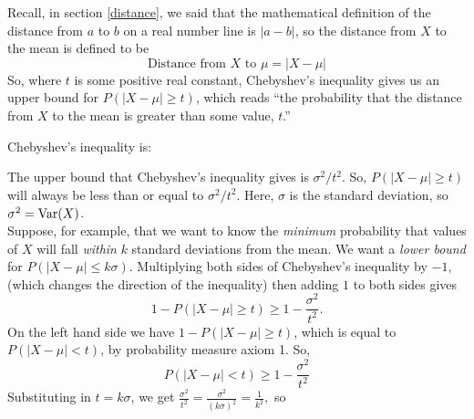 \noindent Recall, in section \ref{distance}, we said that the mathematical definition of the distance from $a$ to $b$ on a real number line is $|a-b|$, so the distance from $X$ to the mean is defined to be
\[
\text{Distance from $X$ to $\mu$} = |X - \mu|
\]
So, where $t$ is some positive real constant, Chebyshev's inequality gives us an upper bound for $P(|X - \mu| \geq t)$, which reads ``the probability that the distance from $X$ to the mean is greater than some value, $t$.''

\noindent Chebyshev's inequality is:

  	\bigskip
	
	\hfil{}
	\bigskip
	\bigskip
	
\noindent The upper bound that Chebyshev's inequality gives is $\sigma^2/t^2$. So, $P(|X - \mu| \geq t)$ will always be less than or equal to $\sigma^2/t^2$. Here, $\sigma$ is the standard deviation, so $\sigma^2 = \text{Var}(X)$. \\

\noindent Suppose, for example, that we want to know the \textit{minimum} probability that values of $X$ will fall \textit{within} $k$ standard deviations from the mean. We want a \textit{lower bound} for $P(|X-\mu| \leq k\sigma)$. Multiplying both sides of Chebyshev's inequality by $-1$, (which changes the direction of the inequality) then adding $1$ to both sides gives
\[
1 - P(|X-\mu| \geq t) \geq 1 - \frac{\sigma^2}{t^2}.
\]
On the left hand side we have $1 - P(|X-\mu| \geq t)$, which is equal to $P(|X-\mu| < t)$, by probability measure axiom 1. So,
\[
P(|X-\mu| < t) \geq 1 - \frac{\sigma^2}{t^2}
\]
Substituting in $t = k\sigma$, we get $\frac{\sigma^2}{t^2} = \frac{\sigma^2}{(k\sigma)^2} = \frac{1}{k^2},$ so

  	\bigskip
	
	\hfil{}
	\bigskip
	\bigskip

